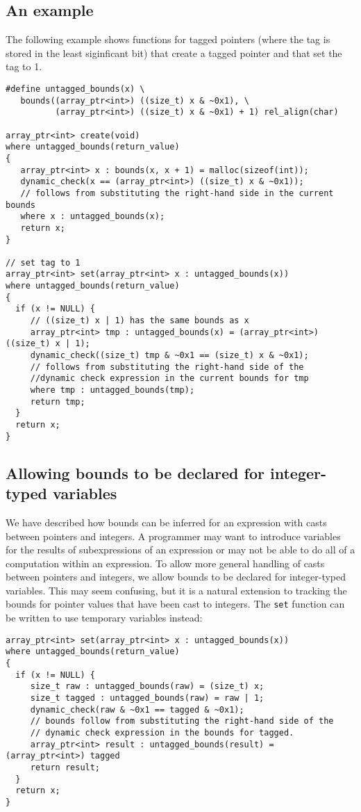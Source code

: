 \subsection{An example}

The following example shows functions for tagged pointers
(where the tag is stored in the least siginficant bit) that
create a tagged pointer and that set the tag to 1.

\begin{lstlisting}
#define untagged_bounds(x) \
   bounds((array_ptr<int>) ((size_t) x & ~0x1), \
          (array_ptr<int>) ((size_t) x & ~0x1) + 1) rel_align(char)

array_ptr<int> create(void) 
where untagged_bounds(return_value)
{
   array_ptr<int> x : bounds(x, x + 1) = malloc(sizeof(int));
   dynamic_check(x == (array_ptr<int>) ((size_t) x & ~0x1));
   // follows from substituting the right-hand side in the current bounds
   where x : untagged_bounds(x); 
   return x;
}

// set tag to 1
array_ptr<int> set(array_ptr<int> x : untagged_bounds(x)) 
where untagged_bounds(return_value)
{
  if (x != NULL) {
     // ((size_t) x | 1) has the same bounds as x                   
     array_ptr<int> tmp : untagged_bounds(x) = (array_ptr<int>) ((size_t) x | 1);
     dynamic_check((size_t) tmp & ~0x1 == (size_t) x & ~0x1);
     // follows from substituting the right-hand side of the
     //dynamic check expression in the current bounds for tmp
     where tmp : untagged_bounds(tmp);
     return tmp;
  }
  return x;
}
\end{lstlisting}

\subsection{Allowing bounds to be declared for integer-typed variables}

We have described how bounds can be inferred for an expression with
casts between pointers and integers.  A programmer may want to
introduce variables for the results of subexpressions of an
expression or may not be able to do all of a computation within an expression.
To allow more general handling of casts between pointers and
integers, we allow bounds to be declared for integer-typed variables.
This may seem confusing, but it is a natural extension to tracking the
bounds for pointer values that have been cast to integers.   The \verb+set+
function can be written to use temporary variables instead:
\begin{lstlisting}
array_ptr<int> set(array_ptr<int> x : untagged_bounds(x))
where untagged_bounds(return_value)
{
  if (x != NULL) {
     size_t raw : untagged_bounds(raw) = (size_t) x;
     size_t tagged : untagged_bounds(raw) = raw | 1;
     dynamic_check(raw & ~0x1 == tagged & ~0x1);
     // bounds follow from substituting the right-hand side of the
     // dynamic check expression in the bounds for tagged.
     array_ptr<int> result : untagged_bounds(result) = (array_ptr<int>) tagged
     return result;
  }
  return x;
}
\end{lstlisting}

